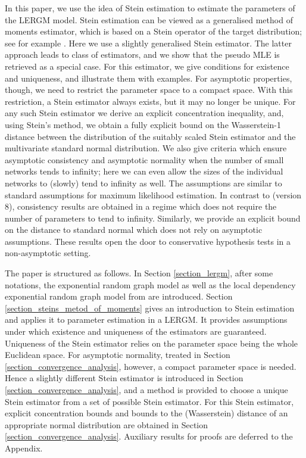\documentclass{article}
\begin{document}
In this paper, we use the idea of Stein estimation to estimate the parameters of the LERGM model. Stein estimation can be viewed as a generalised method of moments estimator, which is based on a Stein operator of the target distribution; see for example \cite{anastasiou2023stein, ebner2025stein}. Here we use a slightly generalised Stein estimator. The latter approach leads to class of estimators, and we show that the pseudo MLE is retrieved as a special case. For this estimator, we give conditions for existence and uniqueness, and illustrate them with examples. For asymptotic properties, though, we need to restrict the parameter space to a compact space. With this restriction, a Stein estimator always exists, but it may no longer be unique. For any such Stein estimator we derive an explicit concentration inequality, and, using Stein's method, we obtain a fully explicit bound on the Wasserstein-1 distance between the distribution of the suitably scaled Stein estimator and the multivariate standard normal distribution. We also give criteria which ensure asymptotic consistency and asymptotic normality when the number of small networks tends to infinity; here we can even allow the sizes of the individual networks to (slowly) tend to infinity as well. The assumptions are similar to standard assumptions for maximum likelihood estimation. In contrast to \cite{stewart2026pseudo} (version 8), consistency results are obtained in a regime which does not require the number of parameters to tend to infinity. Similarly, we provide an  explicit bound on the distance to standard normal which does not rely on asymptotic assumptions. These results open the door to conservative hypothesis tests in a non-asymptotic setting.

The paper is structured as follows. In Section \ref{section_lergm}, after some notations, the exponential random graph model as well as the local dependency exponential random graph model from \cite{schweinberger2015local} are  introduced. Section \ref{section_steins_metod_of_moments} gives an introduction to Stein estimation and applies it to parameter estimation in a LERGM. It provides assumptions under which existence and uniqueness of the estimators are guaranteed. Uniqueness of the Stein estimator relies on the parameter space being the whole Euclidean space. For asymptotic normality, treated in Section \ref{section_convergence_analysis}, however, a compact parameter space is needed. Hence a slightly different Stein estimator is introduced in Section \ref{section_convergence_analysis}, and a method is provided to choose a unique Stein estimator from a set of possible Stein estimator.  For this Stein estimator, explicit concentration bounds and bounds to the (Wasserstein) distance of an appropriate normal distribution are obtained in Section \ref{section_convergence_analysis}. Auxiliary results for proofs are deferred to the Appendix. 
\end{document}

